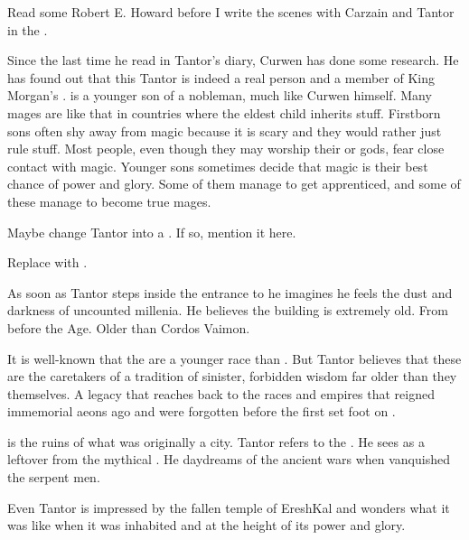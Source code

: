 \begin{changes}
\begin{comment}
    \paragraph{The Gods of \EreshKal}
  \end{comment}
    
    Read some Robert E. Howard before I write the scenes with Carzain and Tantor in the \wylde. 
    
    Since the last time he read in Tantor's diary, Curwen has done some research.
    He has found out that this \Jirad Tantor is indeed a real person and a member of King Morgan's \ishrah.
    \Jirad is a younger son of a nobleman, much like Curwen himself. 
    Many mages are like that in countries where the eldest child inherits stuff.
    Firstborn sons often shy away from magic because it is scary and they would rather just rule stuff.
    Most people, even though they may worship their \Archons or gods, fear close contact with magic. 
    Younger sons sometimes decide that magic is their best chance of power and glory.
    Some of them manage to get apprenticed, and some of these manage to become true mages. 
    
    Maybe change Tantor into a \scatha. 
    If so, mention it here.
    
    Replace  with . 
    
    As soon as Tantor steps inside the entrance to \EreshKal{} he imagines he feels the dust and darkness of uncounted millenia. 
    He believes the building is extremely old. 
    From before the \Human{} Age. 
    Older than Cordos Vaimon. 
    
    It is well-known that the \meccara{} are a younger race than \humans. 
    But Tantor believes that these \EreshKali{} are the caretakers of a tradition of sinister, forbidden wisdom far older than they themselves. 
    A legacy that reaches back to the races and empires that reigned immemorial aeons ago and were forgotten before the first \humans{} set foot on \Miith. 
    
    \EreshKal{} is the ruins of what was originally a \quiljaaran{} city. 
    Tantor refers to the . 
    He sees \EreshKal{} as a leftover from the mythical . 
    He daydreams of the ancient wars when \humans{} vanquished the serpent men. 

    Even \Jirad Tantor is impressed by the fallen temple of EreshKal and wonders what it was like when it was inhabited and at the height of its power and glory.
    

\end{changes}
